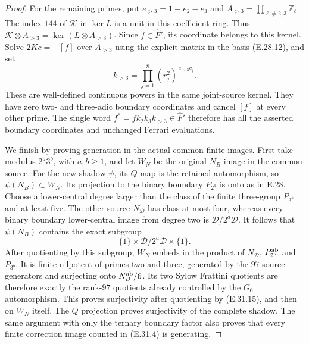 \begin{proof}
For the remaining primes, put
$e_{>3}=1-e_2-e_3$ and
$A_{>3}=\prod_{\ell\ne2,3}\mathbb Z_\ell$.
The index $144$ of $\mathcal K$ in $\ker L$
is a unit in this coefficient ring.  Thus
$\mathcal K\otimes A_{>3}=\ker(L\otimes A_{>3})$.
Since $f\in\widehat F'$, its coordinate belongs
to this kernel.  Solve $2Kc=-[f]$ over $A_{>3}$
using the explicit matrix in the basis
(E.28.12), and set
\[
                    k_{>3}=\prod_{j=1}^8
                        (r_j^2)^{\,e_{>3}c_j}.
 \tag{E.31.14}
\]
These are well-defined continuous powers in the
same joint-source kernel.  They have zero
two- and three-adic boundary coordinates and
cancel $[f]$ at every other prime.
The single word
$f^\ast=fk_2k_3k_{>3}\in\widehat F'$
therefore has all the asserted boundary
coordinates and unchanged Ferrari evaluations.

We finish by proving generation in the actual
common finite images.  First take modulus
$2^a3^b$, with $a,b\ge1$, and let $W_N$ be
the original $N_B$ image in the common source.
For the new shadow $\psi$, its $Q$ map is the
retained automorphism, so $\psi(N_B)\subset W_N$.
Its projection to the binary boundary $P_{2^a}$
is onto as in E.28.  Choose a lower-central
degree larger than the class of the finite
three-group $P_{3^b}$ and at least five.
The other source $N_{\mathscr D}$ has class
at most four, whereas every binary boundary
lower-central image from degree two is
$\mathcal D/2^a\mathcal D$.  It follows that
$\psi(N_B)$ contains the exact subgroup
\[
              \{1\}\times\mathcal D/2^a\mathcal D
                         \times\{1\}.
 \tag{E.31.15}
\]
After quotienting by this subgroup, $W_N$
embeds in the product of $N_{\mathscr D}$,
$P_{2^a}^{\rm ab}$ and $P_{3^b}$.
It is finite nilpotent of primes two and
three, generated by the $97$ source
generators and surjecting onto
$N_B^{\rm ab}/6$.  Its two Sylow Frattini
quotients are therefore exactly the
rank-$97$ quotients already controlled
by the $G_6$ automorphism.  This proves
surjectivity after quotienting by
(E.31.15), and then on $W_N$ itself.
The $Q$ projection proves surjectivity
of the complete shadow.  The same argument
with only the ternary boundary factor
also proves that every finite correction
image counted in (E.31.4) is generating.


\end{proof}
